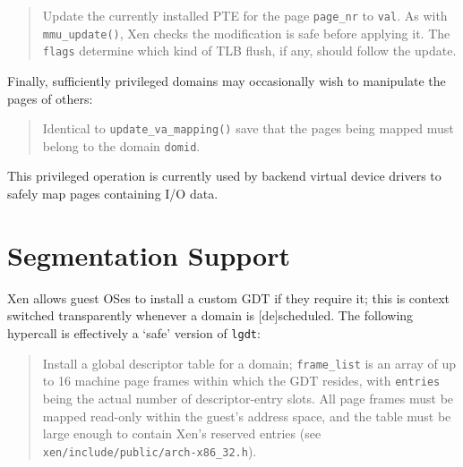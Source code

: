 \begin{quote} 

Update the currently installed PTE for the page {\tt page\_nr} to 
{\tt val}. As with {\tt mmu\_update()}, Xen checks the modification 
is safe before applying it. The {\tt flags} determine which kind
of TLB flush, if any, should follow the update. 

\end{quote} 

Finally, sufficiently privileged domains may occasionally wish to manipulate 
the pages of others: 
\begin{quote}


Identical to {\tt update\_va\_mapping()} save that the pages being
mapped must belong to the domain {\tt domid}. 

\end{quote}

This privileged operation is currently used by backend virtual device
drivers to safely map pages containing I/O data. 



\section{Segmentation Support}

Xen allows guest OSes to install a custom GDT if they require it; 
this is context switched transparently whenever a domain is 
[de]scheduled.  The following hypercall is effectively a 
`safe' version of {\tt lgdt}: 

\begin{quote}

Install a global descriptor table for a domain; {\tt frame\_list} is
an array of up to 16 machine page frames within which the GDT resides,
with {\tt entries} being the actual number of descriptor-entry
slots. All page frames must be mapped read-only within the guest's
address space, and the table must be large enough to contain Xen's
reserved entries (see {\tt xen/include/public/arch-x86\_32.h}).

\end{quote}

